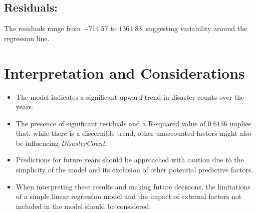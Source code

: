 \documentclass[11pt]{article}\usepackage[]{graphicx}\usepackage[]{xcolor}
\begin{document}
\subsection*{Residuals:}
The residuals range from $-714.57$ to $1361.83$, suggesting variability around the regression line.

\section*{Interpretation and Considerations}
\begin{itemize}
    \item The model indicates a significant upward trend in disaster counts over the years.
    \item The presence of significant residuals and a R-squared value of $0.6156$ implies that, while there is a discernible trend, other unaccounted factors might also be influencing \textit{DisasterCount}.
    \item Predictions for future years should be approached with caution due to the simplicity of the model and its exclusion of other potential predictive factors.
    \item When interpreting these results and making future decisions, the limitations of a simple linear regression model and the impact of external factors not included in the model should be considered.
\end{itemize}
\end{document}
